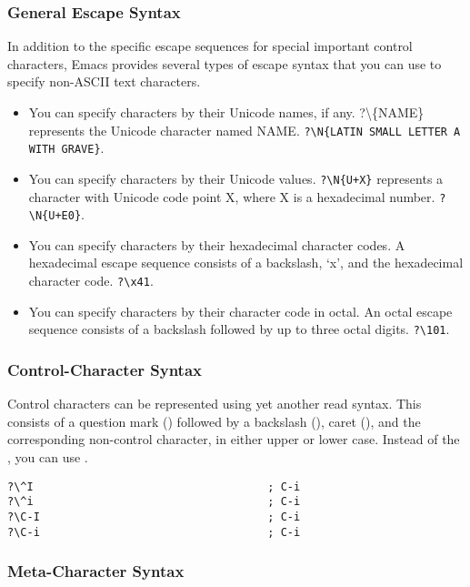 \subsubsection{General Escape Syntax}
\label{sec:gener-escape-synt}

In addition to the specific escape sequences for special important control characters, Emacs provides several types of escape syntax that you can use to specify non-ASCII text characters.
\begin{itemize}
\item You can specify characters by their Unicode names, if any.
  ?\textbackslash{}\{NAME\} represents the Unicode character named NAME.
  \lstinline|?\N{LATIN SMALL LETTER A WITH GRAVE}|.
\item You can specify characters by their Unicode values.
  \lstinline|?\N{U+X}| represents a character with Unicode code point X, where X is a hexadecimal number.
  \lstinline|?\N{U+E0}|.
\item You can specify characters by their hexadecimal character codes.
  A hexadecimal escape sequence consists of a backslash, ‘x’, and the hexadecimal character code.
  \lstinline|?\x41|.
\item You can specify characters by their character code in octal.
  An octal escape sequence consists of a backslash followed by up to three octal digits.
  \lstinline|?\101|.
\end{itemize}



\subsubsection{Control-Character Syntax}
\label{sec:contr-char-synt}


Control characters can be represented using yet another read syntax.
This consists of a question mark () followed by a backslash (\keyword{\textbackslash{}}), caret (\keyword{\textasciicircum{}}), and the corresponding non-control character, in either upper or lower case.
Instead of the \keyword{\textasciicircum{}}, you can use .
\begin{lstlisting}
?\^I                                    ; C-i
?\^i                                    ; C-i
?\C-I                                   ; C-i
?\C-i                                   ; C-i
\end{lstlisting}


\subsubsection{Meta-Character Syntax}
\label{sec:meta-char-synt}

